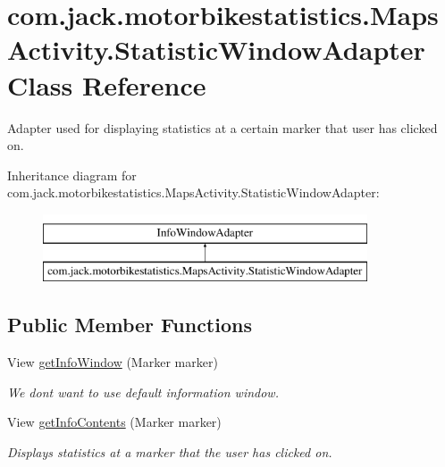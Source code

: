 \hypertarget{classcom_1_1jack_1_1motorbikestatistics_1_1_maps_activity_1_1_statistic_window_adapter}{}\section{com.\+jack.\+motorbikestatistics.\+Maps\+Activity.\+Statistic\+Window\+Adapter Class Reference}
\label{classcom_1_1jack_1_1motorbikestatistics_1_1_maps_activity_1_1_statistic_window_adapter}


Adapter used for displaying statistics at a certain marker that user has clicked on.  


Inheritance diagram for com.\+jack.\+motorbikestatistics.\+Maps\+Activity.\+Statistic\+Window\+Adapter\+:\begin{figure}[H]
\begin{center}
\leavevmode
\includegraphics[height=2.000000cm]{classcom_1_1jack_1_1motorbikestatistics_1_1_maps_activity_1_1_statistic_window_adapter}
\end{center}
\end{figure}
\subsection*{Public Member Functions}
\begin{DoxyCompactItemize}
\item 
\mbox{\label{classcom_1_1jack_1_1motorbikestatistics_1_1_maps_activity_1_1_statistic_window_adapter_ac13436e2a05256245736e6cfb8e0af4b}} 
View \hyperlink{classcom_1_1jack_1_1motorbikestatistics_1_1_maps_activity_1_1_statistic_window_adapter_ac13436e2a05256245736e6cfb8e0af4b}{get\+Info\+Window} (Marker marker)
\begin{DoxyCompactList}\small\item\em We don\textquotesingle{}t want to use default information window. \end{DoxyCompactList}\item 
View \hyperlink{classcom_1_1jack_1_1motorbikestatistics_1_1_maps_activity_1_1_statistic_window_adapter_a7430ace867de8932341d6f07674013e9}{get\+Info\+Contents} (Marker marker)
\begin{DoxyCompactList}\small\item\em Displays statistics at a marker that the user has clicked on. \end{DoxyCompactList}\end{DoxyCompactItemize}


